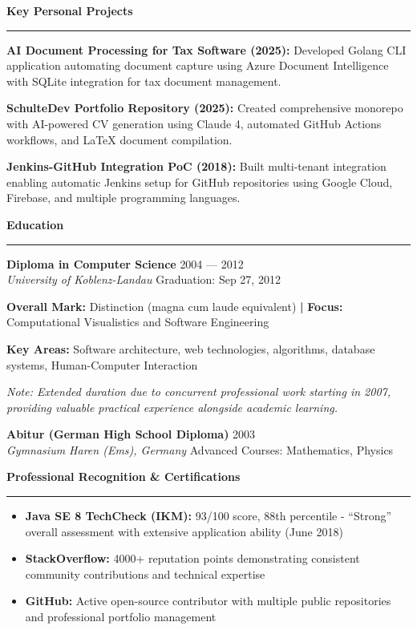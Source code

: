 \documentclass[11pt,a4paper]{article}
\newcommand{\sectiontitle}[1]{%
  \vspace{8pt}
  {\color{darkblue}\Large\bfseries #1}
  \vspace{4pt}
  \hrule
  \vspace{6pt}
}
\newcommand{\jobtitle}[4]{%
  \vspace{4pt}
  {\bfseries #1} \hfill {\color{lightgray}\small #2}\\
  {\itshape #3} \hfill {\color{lightgray}\small #4}
  \vspace{2pt}
}
\begin{document}
\vspace{8pt}

\sectiontitle{Key Personal Projects}

\textbf{AI Document Processing for Tax Software (2025):} Developed Golang CLI application automating document capture using Azure Document Intelligence with SQLite integration for tax document management.

\textbf{SchulteDev Portfolio Repository (2025):} Created comprehensive monorepo with AI-powered CV generation using Claude 4, automated GitHub Actions workflows, and LaTeX document compilation.

\textbf{Jenkins-GitHub Integration PoC (2018):} Built multi-tenant integration enabling automatic Jenkins setup for GitHub repositories using Google Cloud, Firebase, and multiple programming languages.

\vfill

\newpage

\sectiontitle{Education}

\jobtitle{Diploma in Computer Science}{2004 --- 2012}{University of Koblenz-Landau}{Graduation: Sep 27, 2012}

\textbf{Overall Mark:} Distinction (magna cum laude equivalent) \textbf{|} \textbf{Focus:} Computational Visualistics and Software Engineering

\textbf{Key Areas:} Software architecture, web technologies, algorithms, database systems, Human-Computer Interaction

\textit{Note: Extended duration due to concurrent professional work starting in 2007, providing valuable practical experience alongside academic learning.}

\vspace{6pt}

\jobtitle{Abitur (German High School Diploma)}{2003}{Gymnasium Haren (Ems), Germany}{Advanced Courses: Mathematics, Physics}

\vspace{8pt}

\sectiontitle{Professional Recognition \& Certifications}

\begin{itemize}
\item \textbf{Java SE 8 TechCheck (IKM):} 93/100 score, 88th percentile - ``Strong'' overall assessment with extensive application ability (June 2018)
\item \textbf{StackOverflow:} 4000+ reputation points demonstrating consistent community contributions and technical expertise
\item \textbf{GitHub:} Active open-source contributor with multiple public repositories and professional portfolio management
\end{itemize}
\end{document}
